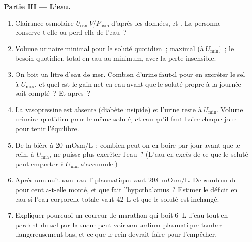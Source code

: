 \begin{problem}
\medskip
\noindent\textbf{Partie III --- L'eau.}
\begin{enumerate}[resume]
  \item Clairance osmolaire $U_{\text{osm}}V/P_{\text{osm}}$ d'après les
        données, et . La personne conserve-t-elle
        ou perd-elle de l'eau~?
  \item Volume urinaire minimal pour le soluté quotidien~; maximal (à
        $U_{\min}$)~; le besoin quotidien total en eau au minimum, avec
        la perte insensible.
  \item On boit un litre d'eau de mer. Combien d'urine faut-il pour en
        excréter le sel à $U_{\max}$, et quel est le gain net en eau
        avant que le soluté propre à la journée soit compté~? Et après~?
  \item La vasopressine est absente (diabète insipide) et l'urine reste
        à $U_{\min}$. Volume urinaire quotidien pour le même soluté, et
        eau qu'il faut boire chaque jour pour tenir l'équilibre.
  \item De la bière à \qty{20}{mOsm/L}~: combien peut-on en boire par
        jour avant que le rein, à $U_{\min}$, ne puisse plus excréter
        l'eau~? (L'eau en excès de ce que le soluté peut emporter à
        $U_{\min}$ s'accumule.)
  \item Après une nuit sans eau l' plasmatique vaut
        \qty{298}{mOsm/L}. De combien de pour cent a-t-elle monté, et
        que fait l'hypothalamus~? Estimer le déficit en eau si l'eau
        corporelle totale vaut \qty{42}{L} et que le soluté est
        inchangé.
  \item Expliquer pourquoi un coureur de marathon qui boit \qty{6}{L}
        d'eau tout en perdant du sel par la sueur peut voir son sodium
        plasmatique tomber dangereusement bas, et ce que le rein devrait
        faire pour l'empêcher.
\end{enumerate}


\end{problem}
